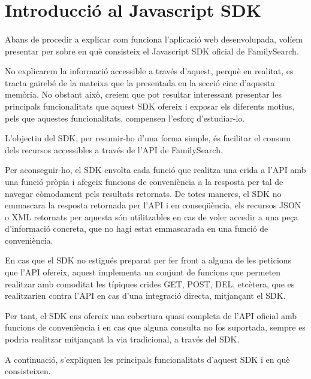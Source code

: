 \section{Introducció al Javascript SDK}

    \paragraph{}
    Abans de procedir a explicar com funciona l'aplicació web desenvolupada, volíem presentar per sobre en què consisteix el Javascript SDK oficial de FamilySearch.

    No explicarem la informació accessible a través d'aquest, perquè en realitat, es tracta gairebé de la mateixa que la presentada en la secció cinc d'aquesta memòria. No obstant això, creiem que pot resultar interessant presentar les principals funcionalitats que aquest SDK ofereix i exposar els diferents motius, pels que aquestes funcionalitats, compensen l’esforç d’estudiar-lo.

    L’objectiu del SDK, per resumir-ho d’una forma simple, és facilitar el consum dels recursos accessibles a través de l'API de FamilySearch.

    Per aconseguir-ho, el SDK envolta cada funció que realitza una crida a l’API amb una funció pròpia i afegeix funcions de conveniència a la resposta per tal de navegar còmodament pels resultats retornats. De totes maneres, el SDK no emmascara la resposta retornada per l’API i en conseqüència, els recursos JSON o XML retornats per aquesta són utilitzables en cas de voler accedir a una peça d'informació concreta, que no hagi estat emmascarada en una funció de conveniència.

    En cas que el SDK no estigués preparat per fer front a alguna de les peticions que l’API ofereix, aquest implementa un conjunt de funcions que permeten realitzar amb comoditat les típiques crides GET, POST, DEL, etcètera, que es realitzarien contra l’API en cas d’una integració directa, mitjançant el SDK.

    Per tant, el SDK ens ofereix una cobertura quasi completa de l’API oficial amb funcions de conveniència i en cas que alguna consulta no fos suportada, sempre es podria realitzar mitjançant la via tradicional, a través del SDK.

    A continuació, s'expliquen les principals funcionalitats d'aquest SDK i en què consisteixen.
